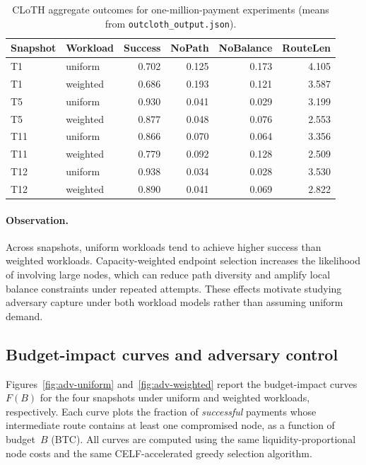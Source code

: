 \documentclass{article}
\begin{document}
\begin{table}[t]
\centering
\caption{CLoTH aggregate outcomes for one-million-payment experiments (means from \texttt{outcloth\_output.json}).}
\label{tab:cloth-stats}
\begin{tabular}{llrrrr}
\toprule
Snapshot & Workload & Success & NoPath & NoBalance & RouteLen \\
\midrule
T1  & uniform  & 0.702 & 0.125 & 0.173 & 4.105 \\
T1  & weighted & 0.686 & 0.193 & 0.121 & 3.587 \\
T5  & uniform  & 0.930 & 0.041 & 0.029 & 3.199 \\
T5  & weighted & 0.877 & 0.048 & 0.076 & 2.553 \\
T11 & uniform  & 0.866 & 0.070 & 0.064 & 3.356 \\
T11 & weighted & 0.779 & 0.092 & 0.128 & 2.509 \\
T12 & uniform  & 0.938 & 0.034 & 0.028 & 3.530 \\
T12 & weighted & 0.890 & 0.041 & 0.069 & 2.822 \\
\bottomrule
\end{tabular}
\end{table}

\paragraph{Observation.}
Across snapshots, uniform workloads tend to achieve higher success than weighted workloads.
Capacity-weighted endpoint selection increases the likelihood of involving large nodes, which can reduce path diversity and amplify local balance constraints under repeated attempts.
These effects motivate studying adversary capture under both workload models rather than assuming uniform demand.

\subsection{Budget-impact curves and adversary control}
Figures~\ref{fig:adv-uniform} and~\ref{fig:adv-weighted} report the budget-impact curves $F(B)$ for the four snapshots under uniform and weighted workloads, respectively.
Each curve plots the fraction of \emph{successful} payments whose intermediate route contains at least one compromised node, as a function of budget~$B$ (BTC).
All curves are computed using the same liquidity-proportional node costs and the same CELF-accelerated greedy selection algorithm.
\end{document}
